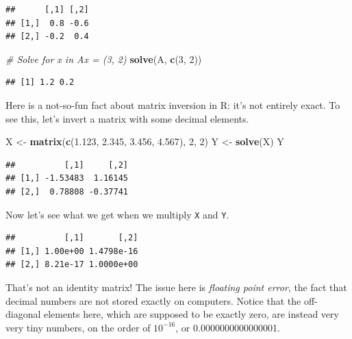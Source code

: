 \documentclass[12pt,oneside,openany]{book}
\newenvironment{Shaded}{\begin{snugshade}}{\end{snugshade}}
\newcommand{\KeywordTok}[1]{\textcolor[rgb]{0.13,0.29,0.53}{\textbf{{#1}}}}
\newcommand{\DecValTok}[1]{\textcolor[rgb]{0.00,0.00,0.81}{{#1}}}
\newcommand{\FloatTok}[1]{\textcolor[rgb]{0.00,0.00,0.81}{{#1}}}
\newcommand{\StringTok}[1]{\textcolor[rgb]{0.31,0.60,0.02}{{#1}}}
\newcommand{\CommentTok}[1]{\textcolor[rgb]{0.56,0.35,0.01}{\textit{{#1}}}}
\newcommand{\NormalTok}[1]{{#1}}
\begin{document}
\begin{verbatim}
##      [,1] [,2]
## [1,]  0.8 -0.6
## [2,] -0.2  0.4
\end{verbatim}

\begin{Shaded}
\begin{Highlighting}[]
\CommentTok{# Solve for x in Ax = (3, 2)}
\KeywordTok{solve}\NormalTok{(A, }\KeywordTok{c}\NormalTok{(}\DecValTok{3}\NormalTok{, }\DecValTok{2}\NormalTok{))}
\end{Highlighting}
\end{Shaded}

\begin{verbatim}
## [1] 1.2 0.2
\end{verbatim}

Here is a not-so-fun fact about matrix inversion in R: it's not entirely
exact. To see this, let's invert a matrix with some decimal elements.

\begin{Shaded}
\begin{Highlighting}[]
\NormalTok{X <-}\StringTok{ }\KeywordTok{matrix}\NormalTok{(}\KeywordTok{c}\NormalTok{(}\FloatTok{1.123}\NormalTok{, }\FloatTok{2.345}\NormalTok{, }\FloatTok{3.456}\NormalTok{, }\FloatTok{4.567}\NormalTok{), }\DecValTok{2}\NormalTok{, }\DecValTok{2}\NormalTok{)}
\NormalTok{Y <-}\StringTok{ }\KeywordTok{solve}\NormalTok{(X)}
\NormalTok{Y}
\end{Highlighting}
\end{Shaded}

\begin{verbatim}
##          [,1]     [,2]
## [1,] -1.53483  1.16145
## [2,]  0.78808 -0.37741
\end{verbatim}

Now let's see what we get when we multiply \texttt{X} and \texttt{Y}.

\begin{Shaded}
\end{Shaded}

\begin{verbatim}
##          [,1]       [,2]
## [1,] 1.00e+00 1.4798e-16
## [2,] 8.21e-17 1.0000e+00
\end{verbatim}

That's not an identity matrix! The issue here is \emph{floating point
error}, the fact that decimal numbers are not stored exactly on
computers. Notice that the off-diagonal elements here, which are
supposed to be exactly zero, are instead very very tiny numbers, on the
order of \(10^{-16}\), or 0.0000000000000001.
\end{document}
